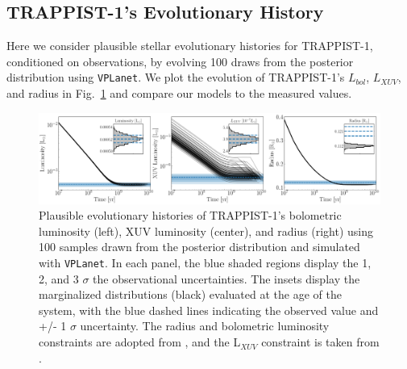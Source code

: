 \documentclass[twocolumn]{aastex62}
\newcommand{\vplanet}[0]{\texttt{VPLanet}\xspace}
\begin{document}
\subsection{TRAPPIST-1's Evolutionary History}

Here we consider plausible stellar evolutionary histories for TRAPPIST-1, conditioned on observations, by evolving 100 draws from the posterior distribution using \vplanet. We plot the evolution of TRAPPIST-1's $L_{bol}$, $L_{XUV}$, and radius in Fig.~\ref{fig:evol} and compare our models to the measured values. 

\begin{figure}[t]
	\includegraphics[width=\textwidth]{../Analysis/Evol/trappist1Evol.pdf}
   \caption{Plausible evolutionary histories of TRAPPIST-1's bolometric luminosity (left), XUV luminosity (center), and radius (right) using 100 samples drawn from the posterior distribution and simulated with \vplanet. In each panel, the blue shaded regions display the 1, 2, and 3 $\sigma$ the observational uncertainties. The insets display the marginalized distributions (black) evaluated at the age of the system, with the blue dashed lines indicating the observed value and +/- 1 $\sigma$ uncertainty. The radius and bolometric luminosity constraints are adopted from \citet{vanGrootel2018}, and the L$_{XUV}$ constraint is taken from \citet{Wheatley2017}.}%
    \label{fig:evol}%
\end{figure}
\end{document}
